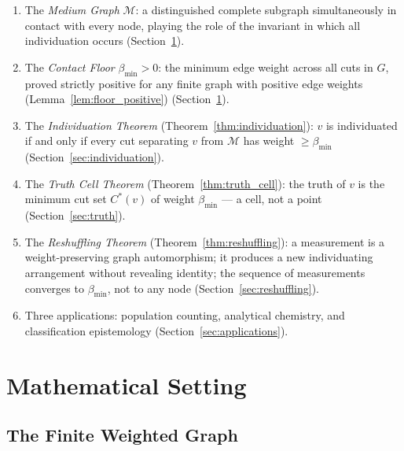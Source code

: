 \documentclass[12pt, a4paper]{article}
\theoremstyle{plain}
\theoremstyle{definition}
\theoremstyle{remark}
\newcommand{\med}{\mathcal{M}}
\newcommand{\bmin}{\beta_{\min}}
\begin{document}
\begin{enumerate}[label=(\roman*)]
  \item The \emph{Medium Graph} $\med$: a distinguished complete subgraph
  simultaneously in contact with every node, playing the role of the
  invariant in which all individuation occurs
  (Section~\ref{sec:setting}).

  \item The \emph{Contact Floor} $\bmin > 0$: the minimum edge weight
  across all cuts in $G$, proved strictly positive for any finite graph
  with positive edge weights (Lemma~\ref{lem:floor_positive})
  (Section~\ref{sec:setting}).

  \item The \emph{Individuation Theorem} (Theorem~\ref{thm:individuation}):
  $v$ is individuated if and only if every cut separating $v$ from $\med$
  has weight $\geq \bmin$ (Section~\ref{sec:individuation}).

  \item The \emph{Truth Cell Theorem} (Theorem~\ref{thm:truth_cell}): the
  truth of $v$ is the minimum cut set $C^*(v)$ of weight $\bmin$ --- a
  cell, not a point (Section~\ref{sec:truth}).

  \item The \emph{Reshuffling Theorem} (Theorem~\ref{thm:reshuffling}): a
  measurement is a weight-preserving graph automorphism; it produces a new
  individuating arrangement without revealing identity; the sequence of
  measurements converges to $\bmin$, not to any node
  (Section~\ref{sec:reshuffling}).

  \item Three applications: population counting, analytical chemistry, and
  classification epistemology (Section~\ref{sec:applications}).
\end{enumerate}

\section{Mathematical Setting}
\label{sec:setting}

\subsection{The Finite Weighted Graph}
\end{document}
